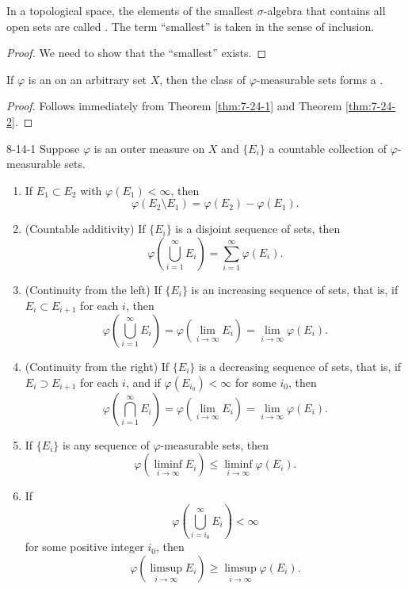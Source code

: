 \documentclass[../main.tex]{subfiles}
\begin{document}
\begin{definition}{}{}
In a topological space, the elements of the smallest $\sigma$-algebra that contains all open sets are called . The term ``smallest'' is taken in the sense of inclusion.
\end{definition}
\begin{proof}
    We need to show that the ``smallest'' exists. 
\end{proof}

\begin{corollary}{}{}
If $\varphi$ is an  on an arbitrary set $X$, then the class of $\varphi$-measurable sets forms a .
\end{corollary}
\begin{proof}
    Follows immediately from Theorem \ref{thm:7-24-1} and Theorem \ref{thm:7-24-2}. 
\end{proof}

\begin{corollary}{}{8-14-1}
Suppose $\varphi$ is an outer measure on $X$ and $\{E_i\}$ a countable collection of $\varphi$-measurable sets.
\begin{enumerate}
    \item[(i)] If $E_1 \subset E_2$ with $\varphi(E_1) < \infty$, then
    \[
        \varphi(E_2 \setminus E_1) = \varphi(E_2) - \varphi(E_1).
    \]
    \item[(ii)] (Countable additivity) If $\{E_i\}$ is a disjoint sequence of sets, then
    \[
        \varphi(\bigcup_{i=1}^{\infty} E_i) = \sum_{i=1}^{\infty} \varphi(E_i).
    \]
    \item[(iii)] (Continuity from the left) If $\{E_i\}$ is an increasing sequence of sets, that is, if $E_i \subset E_{i+1}$ for each $i$, then
    \[
        \varphi(\bigcup_{i=1}^{\infty} E_i) = \varphi(\lim_{i \to \infty} E_i) = \lim_{i \to \infty} \varphi(E_i).
    \]
    \item[(iv)] (Continuity from the right) If $\{E_i\}$ is a decreasing sequence of sets, that is, if $E_i \supset E_{i+1}$ for each $i$, and if $\varphi(E_{i_0}) < \infty$ for some $i_0$, then
    \[
        \varphi(\bigcap_{i=1}^{\infty} E_i) = \varphi(\lim_{i \to \infty} E_i) = \lim_{i \to \infty} \varphi(E_i).
    \]
    \item[(v)] If $\{E_i\}$ is any sequence of $\varphi$-measurable sets, then
    \[
        \varphi(\liminf_{i \to \infty} E_i) \le \liminf_{i \to \infty} \varphi(E_i).
    \]
    \item[(vi)] If
    \[
        \varphi(\bigcup_{i=i_0}^{\infty} E_i) < \infty
    \]
    for some positive integer $i_0$, then
    \[
        \varphi(\limsup_{i \to \infty} E_i) \ge \limsup_{i \to \infty} \varphi(E_i).
    \]
    
\end{enumerate}
\end{corollary}
\end{document}
